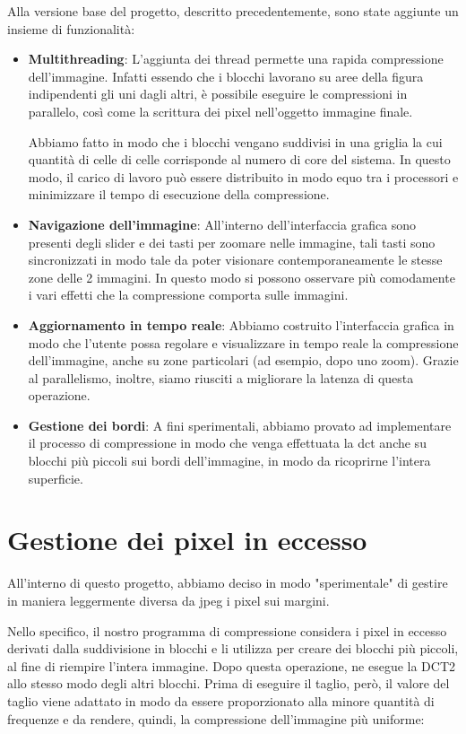 Alla versione base del progetto, descritto precedentemente, sono state aggiunte un insieme di funzionalità:

\begin{itemize}
	\item \textbf{Multithreading}: L'aggiunta dei thread permette una rapida compressione dell'immagine. Infatti essendo che i blocchi lavorano su aree della figura indipendenti gli uni dagli altri, è possibile eseguire le compressioni in parallelo, così come la scrittura dei pixel nell'oggetto immagine finale.
	
	Abbiamo fatto in modo che i blocchi vengano suddivisi in una griglia la cui quantità di celle di celle corrisponde al numero di core del sistema. In questo modo, il carico di lavoro può essere distribuito in modo equo tra i processori e minimizzare il tempo di esecuzione della compressione.
	\item \textbf{Navigazione dell'immagine}: All'interno dell'interfaccia grafica sono presenti degli slider e dei tasti per zoomare nelle immagine, tali tasti sono sincronizzati in modo tale da poter visionare contemporaneamente le stesse zone delle 2 immagini. In questo modo si possono osservare più comodamente i vari effetti che la compressione comporta sulle immagini.
	\item \textbf{Aggiornamento in tempo reale}: Abbiamo costruito l'interfaccia grafica in modo che l'utente possa regolare e visualizzare in tempo reale la compressione dell'immagine, anche su zone particolari (ad esempio, dopo uno zoom). Grazie al parallelismo, inoltre, siamo riusciti a migliorare la latenza di questa operazione.
	\item  \textbf{Gestione dei bordi}:  A fini sperimentali, abbiamo provato ad implementare il processo di compressione in modo che venga effettuata la dct anche su blocchi più piccoli sui bordi dell'immagine, in modo da ricoprirne l'intera superficie.
\end{itemize}

\section{Gestione dei pixel in eccesso}

All'interno di questo progetto, abbiamo deciso in modo "sperimentale" di gestire in maniera leggermente diversa da jpeg i pixel sui margini.

Nello specifico, il nostro programma di compressione considera i pixel in eccesso derivati dalla suddivisione in blocchi e li utilizza per creare dei blocchi più piccoli, al fine di riempire l'intera immagine. Dopo questa operazione, ne esegue la DCT2 allo stesso modo degli altri blocchi. Prima di eseguire il taglio, però, il valore del taglio viene adattato in modo da essere proporzionato alla minore quantità di frequenze e da rendere, quindi, la compressione dell'immagine più uniforme:

